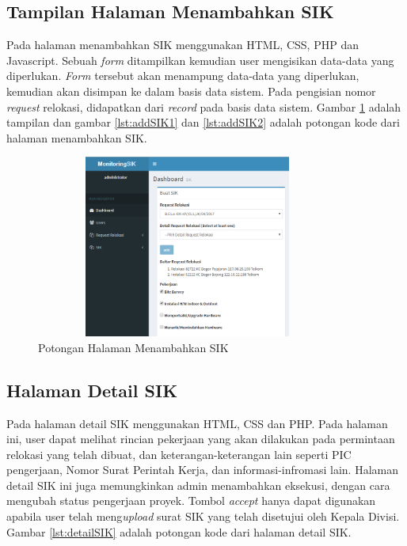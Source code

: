 \subsection{Tampilan Halaman Menambahkan SIK}
Pada halaman menambahkan SIK menggunakan HTML, CSS, PHP dan Javascript. Sebuah \textit{form} ditampilkan kemudian user mengisikan data-data yang diperlukan. \textit{Form} tersebut akan menampung data-data yang diperlukan, kemudian akan disimpan ke dalam basis data sistem. Pada pengisian nomor \textit{request} relokasi, didapatkan dari \textit{record} pada basis data sistem. Gambar \ref*{figure:tambahSIK} adalah tampilan dan gambar \ref{lst:addSIK1} dan \ref{lst:addSIK2} adalah potongan kode dari halaman menambahkan SIK.
\begin{figure}[h!]
\centerline
{\includegraphics[width=10cm,height=6cm]{bab5/addSIK.png}}
\caption{Potongan Halaman Menambahkan SIK}
\label{figure:tambahSIK}
\end{figure}




\subsection{Halaman Detail SIK}
Pada halaman detail SIK menggunakan HTML, CSS dan PHP. Pada halaman ini, user dapat melihat rincian pekerjaan yang akan dilakukan pada permintaan relokasi yang telah dibuat, dan keterangan-keterangan lain seperti PIC pengerjaan, Nomor Surat Perintah Kerja, dan informasi-infromasi lain. Halaman detail SIK ini juga memungkinkan admin menambahkan eksekusi, dengan cara mengubah status pengerjaan proyek. Tombol \textit{accept} hanya dapat digunakan apabila user telah meng\textit{upload} surat SIK yang telah disetujui oleh Kepala Divisi. Gambar \ref{lst:detailSIK} adalah potongan kode dari halaman detail SIK.

